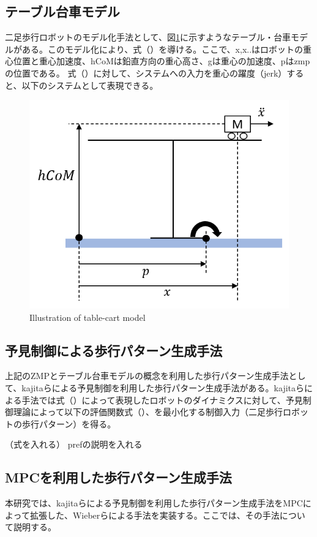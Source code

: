 \subsection{テーブル台車モデル}
二足歩行ロボットのモデル化手法として、図\ref{Fig:tablecart}に示すようなテーブル・台車モデルがある。このモデル化により、式（）を導ける。ここで、x,x..はロボットの重心位置と重心加速度、hCoMは鉛直方向の重心高さ、gは重心の加速度、pはzmpの位置である。
式（）に対して、システムへの入力を重心の躍度（jerk）すると、以下のシステムとして表現できる。

\begin{figure}[hbtp]
  \centering
 \includegraphics[keepaspectratio, scale=0.6]
      {images/table_cart_hcom.png}
 \caption{Illustration of table-cart model }
 \label{Fig:tablecart}
\end{figure}

\subsection{予見制御による歩行パターン生成手法}
上記のZMPとテーブル台車モデルの概念を利用した歩行パターン生成手法として、kajitaらによる予見制御を利用した歩行パターン生成手法\cite{PREVIEW}がある。kajitaらによる手法では式（）によって表現したロボットのダイナミクスに対して、予見制御理論によって以下の評価関数式（）、を最小化する制御入力（二足歩行ロボットの歩行パターン）を得る。

（式を入れる）
prefの説明を入れる

\subsection{MPCを利用した歩行パターン生成手法}
本研究では、kajitaらによる予見制御を利用した歩行パターン生成手法\cite{PREVIEW}をMPCによって拡張した、Wieberらによる手法\cite{WIEBER}を実装する。ここでは、その手法\cite{WIEBER}について説明する。

